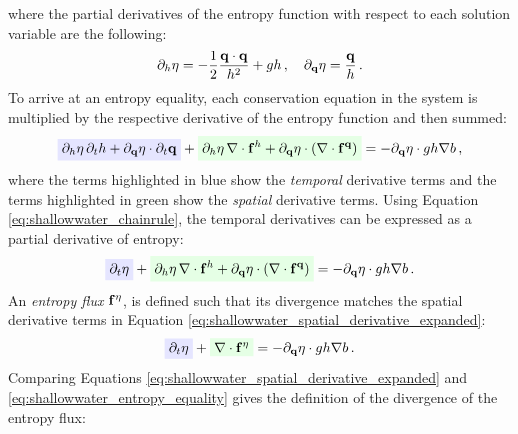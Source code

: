 where the partial derivatives of the entropy function with respect to each
solution variable are the following:
\begin{equation}
  \partial_h\eta
  = -\frac{1}{2}\frac{\mathbf{q}\cdot\mathbf{q}}{h^2}
  + gh \,,
  \quad
  \partial_{\mathbf{q}}\eta = \frac{\mathbf{q}}{h} \,.
\end{equation}
To arrive at an entropy equality, each conservation equation in the system
is multiplied by the respective derivative of the entropy function and then
summed:
\[
  \highlightblue{\partial_\height\entropy\,\partial_\timevalue\height
  + \partial_\heightmomentum\entropy\cdot\partial_\timevalue\heightmomentum}
  + \highlightgreen{\partial_\height\entropy\,\divergence
    \mathbf{\consfluxletter}^\height
  + \partial_\heightmomentum\entropy\cdot\pr{\divergence 
    \mathbf{\consfluxletter}^\heightmomentum}}
  = - \partial_\heightmomentum\entropy\cdot\gravity\height\nabla\bathymetry \eqc
\]
where the terms highlighted in blue show the \emph{temporal} derivative terms
and the terms highlighted in green show the \emph{spatial} derivative terms.
Using Equation \eqref{eq:shallowwater_chainrule}, the temporal derivatives
can be expressed as a partial derivative of entropy:
\begin{equation}\label{eq:shallowwater_spatial_derivative_expanded}
  \highlightblue{\partial_\timevalue\entropy}
  + \highlightgreen{\partial_\height\entropy\,\divergence
    \mathbf{\consfluxletter}^\height
  + \partial_\heightmomentum\entropy\cdot\pr{\divergence
    \mathbf{\consfluxletter}^\heightmomentum}}
  = - \partial_\heightmomentum\entropy\cdot\gravity\height\nabla\bathymetry \eqp
\end{equation}
An \emph{entropy flux} $\mathbf{f}^\eta$, is defined such
that its divergence matches the spatial derivative terms in Equation
\eqref{eq:shallowwater_spatial_derivative_expanded}:
\begin{equation}\label{eq:shallowwater_entropy_equality}
  \highlightblue{\partial_\timevalue\entropy}
  + \highlightgreen{\divergence\mathbf{\consfluxletter}^\entropy}
  = - \partial_\heightmomentum\entropy\cdot\gravity\height\nabla\bathymetry \eqp
\end{equation}
Comparing Equations \eqref{eq:shallowwater_spatial_derivative_expanded} and
\eqref{eq:shallowwater_entropy_equality} gives the definition of the
divergence of the entropy flux:

